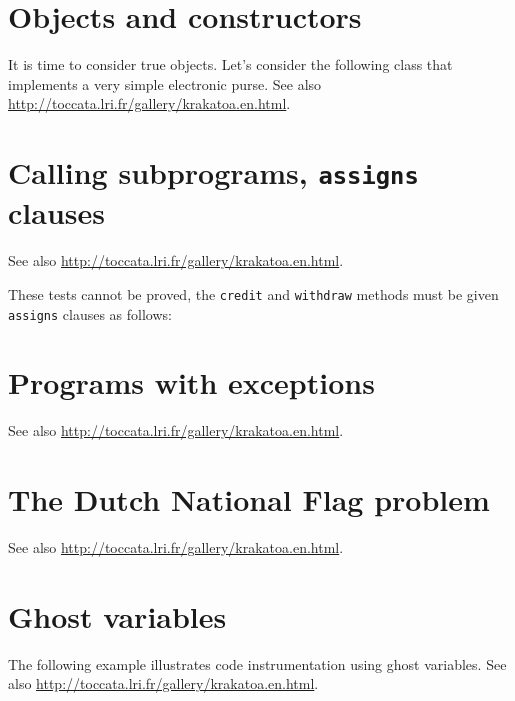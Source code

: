 \documentclass[a4paper,11pt,twoside,openright]{report}
\begin{document}
\section{Objects and constructors}

It is time to consider true \Java{} objects. Let's consider the
following class that implements a very simple electronic purse.
See also \url{http://toccata.lri.fr/gallery/krakatoa.en.html}.



\section{Calling subprograms, \texttt{assigns} clauses}

See also \url{http://toccata.lri.fr/gallery/krakatoa.en.html}.





These tests cannot be proved, the \texttt{credit} and
\texttt{withdraw} methods must be given \texttt{assigns} clauses as
follows:


\section{Programs with exceptions}

See also \url{http://toccata.lri.fr/gallery/krakatoa.en.html}.




\section{The Dutch National Flag problem}

See also \url{http://toccata.lri.fr/gallery/krakatoa.en.html}.



\section{Ghost variables}


The following example illustrates code instrumentation using ghost
variables.
See also \url{http://toccata.lri.fr/gallery/krakatoa.en.html}.
\end{document}

